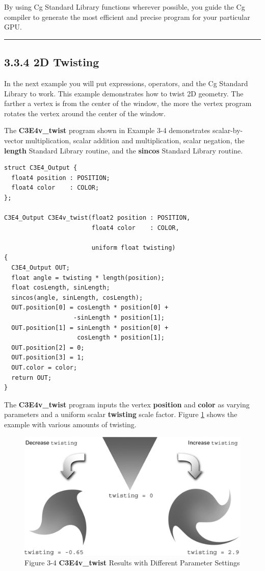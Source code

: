 \documentclass{book}
\begin{document}
By using Cg Standard Library functions wherever possible, you guide the Cg compiler to generate the most efficient and precise program for your particular GPU.
\hrule

\subsection{3.3.4 2D Twisting}

In the next example you will put expressions, operators, and the Cg Standard Library to work. This example demonstrates how to twist 2D geometry. The farther a vertex is from the center of the window, the more the vertex program rotates the vertex around the center of the window.

The \textbf{C3E4v_twist} program shown in Example 3-4 demonstrates scalar-by-vector multiplication, scalar addition and multiplication, scalar negation, the \textbf{length} Standard Library routine, and the \textbf{sincos} Standard Library routine.

\FloatBarrier
\begin{lstlisting}[caption=Example 3-4. The \textbf{C3E4v_twist} Vertex Program]
struct C3E4_Output {
  float4 position : POSITION;
  float4 color    : COLOR;
};

C3E4_Output C3E4v_twist(float2 position : POSITION,
                        float4 color    : COLOR,

                        uniform float twisting)
{
  C3E4_Output OUT;
  float angle = twisting * length(position);
  float cosLength, sinLength;
  sincos(angle, sinLength, cosLength);
  OUT.position[0] = cosLength * position[0] +
                   -sinLength * position[1];
  OUT.position[1] = sinLength * position[0] +
                    cosLength * position[1];
  OUT.position[2] = 0;
  OUT.position[3] = 1;
  OUT.color = color;
  return OUT;
}
\end{lstlisting}
\FloatBarrier

The \textbf{C3E4v_twist} program inputs the vertex \textbf{position} and \textbf{color} as varying parameters and a uniform scalar \textbf{twisting} scale factor. Figure \ref{fig:3-4} shows the example with various amounts of twisting.

\begin{figure}
    \centering
    \includegraphics[width=1\linewidth]{Images/fig3_4.jpg}
    \caption{Figure 3-4 \textbf{C3E4v_twist} Results with Different Parameter Settings}
    \label{fig:3-4}
\end{figure}
\end{document}
